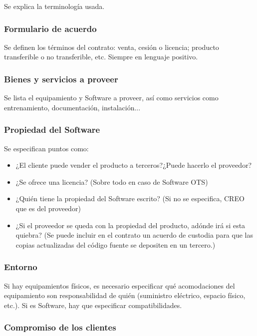 \documentclass[12pt]{article}
\begin{document}
{Se explica la terminología usada.}

\subsubsection{Formulario de acuerdo}
\label{10.4.2}

{Se definen los términos del contrato: venta, cesión o licencia; producto transferible o no transferible, etc. Siempre en lenguaje positivo.}

\subsubsection{Bienes y servicios a proveer}
\label{10.4.3}

{Se lista el equipamiento y Software a proveer, así como servicios como entrenamiento, documentación, instalación...}

\subsubsection{Propiedad del Software}
\label{10.4.4}

{Se especifican puntos como:}

\begin{itemize}
    \item {¿El cliente puede vender el producto a terceros?¿Puede hacerlo el proveedor?}
    \item {¿Se ofrece una licencia? (Sobre todo en caso de Software OTS)}
    \item {¿Quién tiene la propiedad del Software escrito? (Si no se especifica, CREO que es del proveedor)}
    \item {¿Si el proveedor se queda con la propiedad del producto, adónde irá si esta quiebra? (Se puede incluir en el contrato un acuerdo de custodia para que las copias actualizadas del código fuente se depositen en un tercero.)}
\end{itemize}

\subsubsection{Entorno}
\label{10.4.5}

{Si hay equipamientos físicos, es necesario especificar qué acomodaciones del equipamiento son responsabilidad de quién (suministro eléctrico, espacio físico, etc.). Si es Software, hay que especificar compatibilidades.}

\subsubsection{Compromiso de los clientes}
\label{10.4.6}
\end{document}

